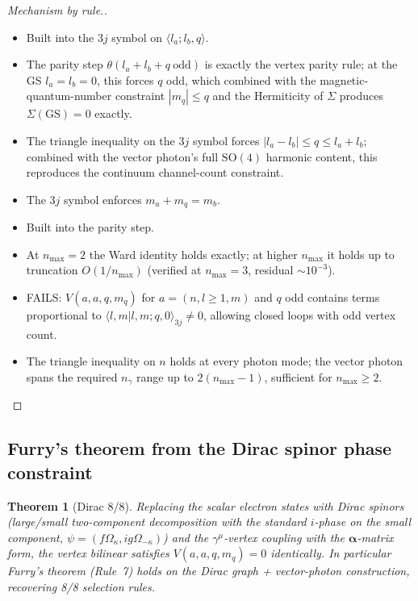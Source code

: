 \documentclass[11pt]{article}
\newtheorem{theorem}{Theorem}
\begin{document}
\begin{proof}[Mechanism by rule.]
\begin{itemize}\setlength{\itemsep}{0pt}
\item[(R1)] Built into the $3j$ symbol on $\langle l_a; l_b, q\rangle$.
\item[(R2)] The parity step $\theta(l_a + l_b + q ~ \text{odd})$ is
exactly the vertex parity rule; at the GS $l_a = l_b = 0$, this
forces $q$ odd, which combined with the magnetic-quantum-number
constraint $|m_q| \le q$ and the Hermiticity of $\Sigma$ produces
$\Sigma(\mathrm{GS}) = 0$ exactly.
\item[(R3)] The triangle inequality on the $3j$ symbol forces
$|l_a - l_b| \le q \le l_a + l_b$; combined with the vector
photon's full $\mathrm{SO}(4)$ harmonic content, this reproduces the
continuum channel-count constraint.
\item[(R4)] The $3j$ symbol enforces $m_a + m_q = m_b$.
\item[(R5)] Built into the parity step.
\item[(R6)] At $n_{\max} = 2$ the Ward identity holds exactly; at
higher $n_{\max}$ it holds up to truncation $O(1/n_{\max})$ (verified
at $n_{\max} = 3$, residual $\sim 10^{-3}$).
\item[(R7)] FAILS: $V(a, a, q, m_q)$ for $a = (n, l \ge 1, m)$ and
$q$ odd contains terms proportional to
$\langle l, m | l, m; q, 0 \rangle_{3j} \ne 0$, allowing closed loops
with odd vertex count.
\item[(R8)] The triangle inequality on $n$ holds at every photon
mode; the vector photon spans the required $n_\gamma$ range up to
$2(n_{\max} - 1)$, sufficient for $n_{\max} \ge 2$.
\end{itemize}
\end{proof}

\subsection{Furry's theorem from the Dirac spinor phase constraint}

\begin{theorem}[Dirac 8/8]
\label{thm:dirac_8_of_8}
Replacing the scalar electron states with Dirac spinors (large/small
two-component decomposition with the standard $i$-phase on the small
component, $\psi = (f \Omega_\kappa, i g \Omega_{-\kappa})$) and the
$\gamma^\mu$-vertex coupling with the $\boldsymbol{\alpha}$-matrix
form, the vertex bilinear satisfies $V(a, a, q, m_q) = 0$
identically.  In particular Furry's theorem (Rule~7) holds on the
Dirac graph + vector-photon construction, recovering 8/8 selection
rules.
\end{theorem}
\end{document}
